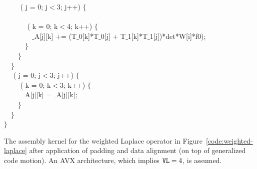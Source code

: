 \begin{algorithm}
~~~~ ( j = 0; j$<$3; j++) $\lbrace$\\
~~~~~~\\
~~~~~~ ( k = 0; k$<$4; k++) $\lbrace$\\
~~~~~~~~$\_$A[j][k] += (T$\_$0[k]*T$\_$0[j] + T$\_$1[k]*T$\_$1[j])*det*W[i]*f0);\\
~~~~~~$\rbrace$\\
~~~~$\rbrace$\\
~~$\rbrace$\\
~~ ( j = 0; j$<$3; j++) $\lbrace$\\
~~~~ ( k = 0; k$<$3; k++) $\lbrace$\\
~~~~~~A[j][k] = $\_$A[j][k];\\
~~~~$\rbrace$\\
~~$\rbrace$\\
$\rbrace$

\caption{The assembly kernel for the weighted Laplace operator in Figure~\ref{code:weighted-laplace} after application of padding and data alignment (on top of generalized code motion). An AVX architecture, which implies $\mbox{\texttt{VL}}=4$, is assumed.}
\label{code:helmholtz-licm-pad}
\end{algorithm}

